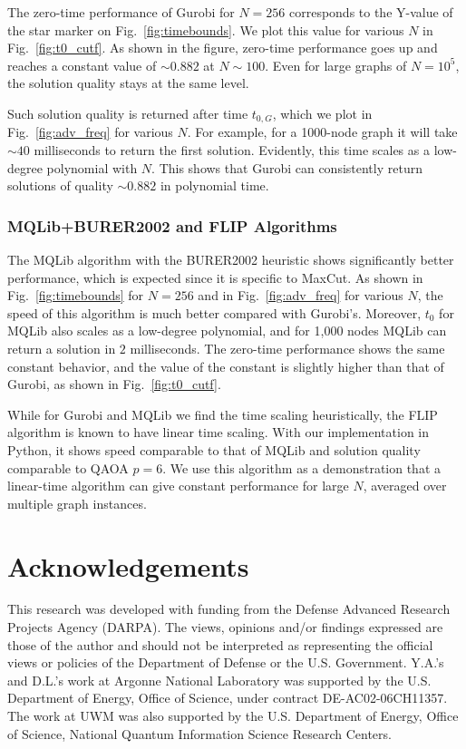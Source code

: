 \documentclass[prb,reprint,nofootinbib,longbibliography,superscriptaddress]{revtex4-1}
\begin{document}
The zero-time performance of Gurobi for $N = 256$ corresponds to the Y-value of the star marker on Fig.~\ref{fig:timebounds}. We plot this value for various $N$ in Fig.~\ref{fig:t0_cutf}. As shown in the figure, zero-time performance goes up and reaches a constant value of $\sim 0.882$ at $N \sim 100$. Even for large graphs of $N = 10^5$, the solution quality stays at the same level.

Such solution quality is returned after time $t_{0,G}$, which we plot in Fig.~\ref{fig:adv_freq} for various $N$. For example, for a 1000-node graph it will take $\sim 40$ milliseconds to return the first solution. Evidently, this time scales as a low-degree polynomial with $N$. This shows that Gurobi can consistently return solutions of quality $\sim 0.882$ in polynomial time.


\subsubsection{MQLib+BURER2002 and FLIP Algorithms}

The MQLib algorithm with the BURER2002 heuristic shows significantly better performance, which is expected since it is specific to MaxCut.
As shown in Fig.~\ref{fig:timebounds} for $N=256$ and in Fig.~\ref{fig:adv_freq} for various $N$, the speed of this algorithm is much better compared with Gurobi's. Moreover, 
$t_0$ for MQLib also scales as a low-degree polynomial, and for 1,000 nodes MQLib can return a solution in $2$ milliseconds.
The zero-time performance shows the same constant behavior, and the value of the constant is slightly higher than that of Gurobi, as shown in Fig.~\ref{fig:t0_cutf}.

While for Gurobi and MQLib we find the time scaling heuristically, the FLIP algorithm is known to have linear time scaling. With our implementation in Python, it shows speed comparable to that of MQLib and solution quality comparable to QAOA $p=6$.
We use this algorithm as a demonstration that a linear-time algorithm can give constant performance for large $N$, averaged over multiple graph instances.




\section{Acknowledgements}

This research was developed with funding from the Defense Advanced Research Projects Agency (DARPA). The views, opinions and/or findings expressed are those of the author and should not be interpreted as representing the official views or policies of the Department of Defense or the U.S. Government.
 Y.A.’s and D.L.'s work at Argonne National Laboratory was supported by the U.S. Department of Energy, Office of Science, under contract DE-AC02-06CH11357.
The work at UWM was also supported by the U.S. Department of Energy, Office of Science, National Quantum Information Science Research Centers.
\\
\end{document}

